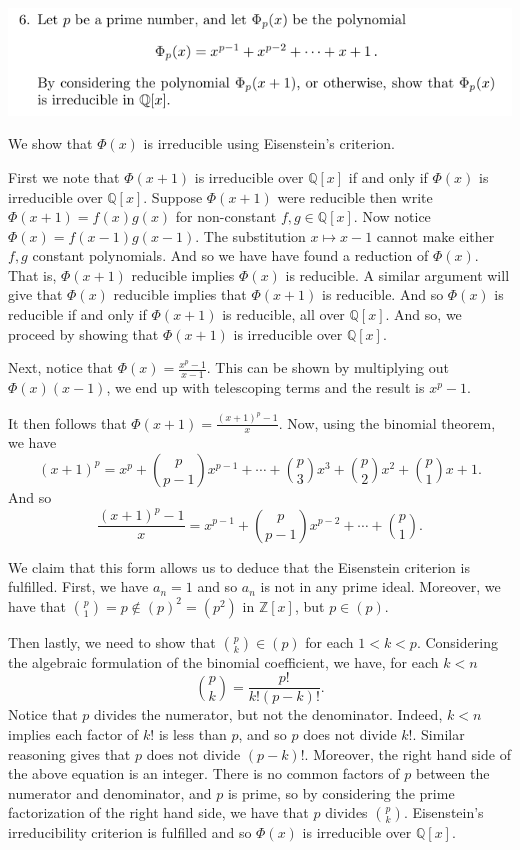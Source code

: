 \documentclass[12pt,letterpaper,boxed]{hmcpset}
\newcommand{\Q}{\mathbb Q}
\newcommand{\Z}{\mathbb Z}
\begin{document}
\newpage

\begin{problem}
	\includegraphics[scale=0.8]{6.png}
	\hfill
\end{problem}

\begin{solution}
We show that $\Phi(x)$ is irreducible using Eisenstein's criterion.

First we note that $\Phi(x+1)$ is irreducible over $\Q[x]$ if and only
if $\Phi(x)$ is irreducible over $\Q[x]$.
Suppose $\Phi(x+1)$ were reducible then write $\Phi(x+1) = f(x)g(x)$
for non-constant $f,g \in \Q[x]$. Now notice $\Phi(x) = f(x-1)g(x-1)$.
The substitution $x \mapsto x-1$ cannot make either $f,g$ constant
polynomials. And so we have have found a reduction of $\Phi(x)$. That
is, $\Phi(x+1)$ reducible implies $\Phi(x)$ is reducible. A similar
argument will give that $\Phi(x)$ reducible implies that $\Phi(x+1)$
is reducible. And so $\Phi(x)$ is reducible if and only if $\Phi(x+1)$
is reducible, all over $\Q[x]$. And so, we proceed by showing that
$\Phi(x+1)$ is irreducible over $\Q[x]$.

Next, notice that $\Phi(x) = \frac{x^p-1}{x-1}$. This can be shown by
multiplying out $\Phi(x)(x-1)$, we end up with telescoping terms and
the result is $x^p - 1$. 

It then follows that $\Phi(x+1) = \frac{(x+1)^p - 1}{x}$. Now, using
the binomial theorem, we have \[
(x+1)^p = x^p + \binom{p}{p-1}x^{p-1} + \cdots + \binom{p}{3}x^3 +
\binom{p}{2}x^2 + \binom{p}{1} x + 1.
\]
And so \[
	\frac{(x+1)^p - 1}{x}
	= x^{p-1} + \binom{p}{p-1} x^{p-2} + \cdots + \binom{p}{1}.
\]

We claim that this form allows us to deduce that the Eisenstein
criterion is fulfilled.
First, we have $a_n = 1$ and so $a_n$ is not in any prime ideal.
Moreover, we have that $\binom{p}{1} = p \not\in (p)^2 = (p^2)$ in
$\Z[x]$, but $p \in (p)$. 

Then lastly, we need to show that $\binom{p}{k} \in (p)$ for each $1 <
k < p$. Considering the algebraic formulation of the binomial
coefficient, we have, for each $k < n$ \[
	\binom{p}{k} = \frac{p!}{k!(p-k)!}.
\]
Notice that $p$ divides the numerator, but not the denominator.
Indeed, $k < n$ implies each factor of $k!$ is less than $p$, and so
$p$ does not divide $k!$. Similar reasoning gives that $p$ does not
divide $(p - k)!$. Moreover, the right hand side of the above equation
is an integer. There is no common factors of $p$ between the numerator
and denominator, and $p$ is prime, so by considering the prime
factorization of the right hand side, we have that $p$ divides $\binom{p}{k}$.
Eisenstein's irreducibility criterion is fulfilled and so $\Phi(x)$ is
irreducible over $\Q[x]$. 

\end{solution}
\end{document}
